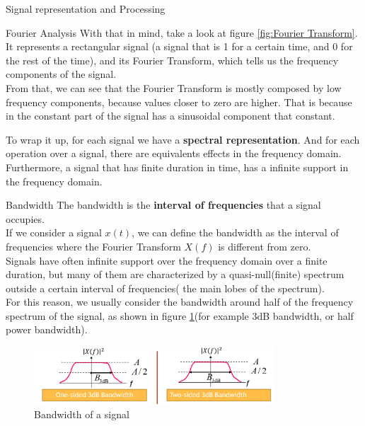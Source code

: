 \begin{section}{Signal representation and Processing}
\begin{subsection}{Fourier Analysis}
    With that in mind, take a look at figure \ref{fig:Fourier Transform}. It represents a rectangular
    signal (a signal that is 1 for a certain time, and 0 for the rest of the time), and its Fourier
    Transform, which tells us the frequency components of the signal.\\
    From that, we can see that the Fourier Transform is mostly composed by low frequency components,
    because values closer to zero are higher. That is because in the constant part of the signal
    has a sinusoidal component that constant.

    \begin{boxH}
      To wrap it up, for each signal we have a \textbf{spectral representation}. And for each operation
      over a signal, there are equivalents effects in the frequency domain.\\
      Furthermore, a signal that has finite duration in time, has a infinite support in the frequency
      domain.
    \end{boxH}
  \end{subsection}
  \begin{subsection}{Bandwidth}
    The bandwidth is the \textbf{interval of frequencies} that a signal occupies.\\
    If we consider a signal $x(t)$, we can define the bandwidth as the interval of frequencies
    where the Fourier Transform $X(f)$ is different from zero. \\ 
    Signals have often infinite support over the frequency domain over a finite duration, but many 
    of them are characterized by a quasi-null(finite) spectrum outside a certain interval of 
    frequencies( the main lobes of the spectrum).\\
    For this reason, we usually consider the bandwidth around half of the frequency spectrum of the
    signal, as shown in figure \ref{fig:Bandwidth}(for example 3dB bandwidth, or half power 
    bandwidth).\\
    \begin{figure}[h]
      \centering
      \includegraphics[width=0.8\textwidth]{img/wireless/bandwidth.png}
      \caption{Bandwidth of a signal}
      \label{fig:Bandwidth}
    \end{figure}

\end{subsection}
\end{section}
